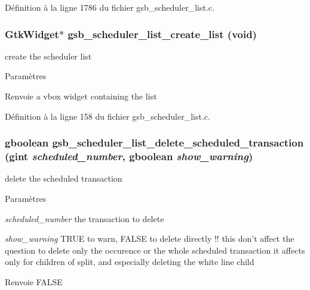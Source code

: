 Définition à la ligne 1786 du fichier gsb\_\-scheduler\_\-list.c.

\subsubsection[{gsb\_\-scheduler\_\-list\_\-create\_\-list}]{\setlength{\rightskip}{0pt plus 5cm}GtkWidget$\ast$ gsb\_\-scheduler\_\-list\_\-create\_\-list (void)}\label{gsb__scheduler__list_8c_a12e2a6349e0cdbd81b349b588f137336}
create the scheduler list


\begin{DoxyParams}{Paramètres}
\item[{\em }]\end{DoxyParams}
\begin{DoxyReturn}{Renvoie}
a vbox widget containing the list 
\end{DoxyReturn}


Définition à la ligne 158 du fichier gsb\_\-scheduler\_\-list.c.

\subsubsection[{gsb\_\-scheduler\_\-list\_\-delete\_\-scheduled\_\-transaction}]{\setlength{\rightskip}{0pt plus 5cm}gboolean gsb\_\-scheduler\_\-list\_\-delete\_\-scheduled\_\-transaction (gint {\em scheduled\_\-number}, \/  gboolean {\em show\_\-warning})}\label{gsb__scheduler__list_8c_a250e1059f152f3bb43280745d0a66fe6}
delete the scheduled transaction


\begin{DoxyParams}{Paramètres}
\item[{\em scheduled\_\-number}]the transaction to delete \item[{\em show\_\-warning}]TRUE to warn, FALSE to delete directly !! this don't affect the question to delete only the occurence or the whole scheduled transaction it affects only for children of split, and especially deleting the white line child\end{DoxyParams}
\begin{DoxyReturn}{Renvoie}
FALSE 
\end{DoxyReturn}


